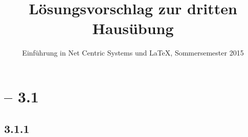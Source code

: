 \documentclass[a4paper,
			llpt,
			solution,
			accentcolor=tud2d,
			colorbacktitle
			]
			{tudexercise}
\title{Lösungsvorschlag zur dritten Hausübung}
\subtitle{Einführung in Net Centric Systems und \LaTeX, Sommersemester 2015}
\newcommand{\8}{$\infty$}
\newcommand{\ezA}{\begin{tabular}{|c|c|c|c|c|c|}
\hline\multicolumn{2}{|c|}{\multirow{2}{*}{$\mathrm{D}^\mathrm{A}$}} & \multicolumn{4}{|c|}{Cost via}\\ \cline{3-6}\multicolumn{2}{|c|}{}& B & C & D & E\\ \hline\multirow{4}{*}{\rotatebox{90}{Destination}}}
\begin{document}
\maketitle
\section{ -- 3.1}
\subsection{3.1.1}
\end{document}
